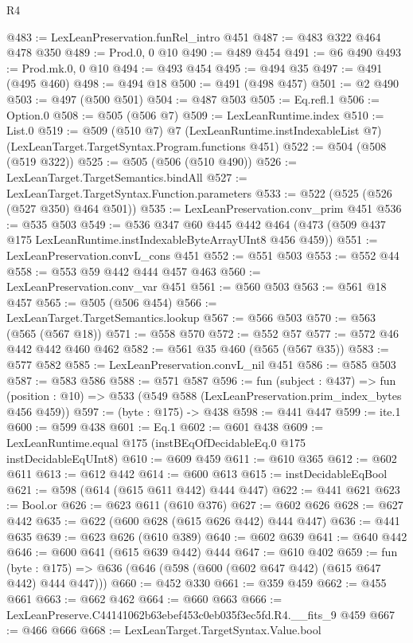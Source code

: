\begin{lexlean}{R4}
\begin{coremodule}
@483 := LexLeanPreservation.funRel_intro @451
@487 := @483 @322 @464 @478 @350
@489 := Prod.{0, 0} @10
@490 := @489 @454
@491 := @6 @490
@493 := Prod.mk.{0, 0} @10
@494 := @493 @454
@495 := @494 @35
@497 := @491 (@495 @460)
@498 := @494 @18
@500 := @491 (@498 @457)
@501 := @2 @490
@503 := @497 (@500 @501)
@504 := @487 @503
@505 := Eq.refl.{1}
@506 := Option.{0}
@508 := @505 (@506 @7)
@509 := LexLeanRuntime.index
@510 := List.{0}
@519 := @509
    (@510 @7)
    @7
    (LexLeanRuntime.instIndexableList @7)
    (LexLeanTarget.TargetSyntax.Program.functions @451)
@522 := @504 (@508 (@519 @322))
@525 := @505 (@506 (@510 @490))
@526 := LexLeanTarget.TargetSemantics.bindAll
@527 := LexLeanTarget.TargetSyntax.Function.parameters
@533 := @522 (@525 (@526 (@527 @350) @464 @501))
@535 := LexLeanPreservation.conv_prim @451
@536 := @535 @503
@549 := @536
    @347
    @60
    @445
    @442
    @464
    (@473 (@509 @437 @175 LexLeanRuntime.instIndexableByteArrayUInt8 @456 @459))
@551 := LexLeanPreservation.convL_cons @451
@552 := @551 @503
@553 := @552 @44
@558 := @553 @59 @442 @444 @457 @463
@560 := LexLeanPreservation.conv_var @451
@561 := @560 @503
@563 := @561 @18 @457
@565 := @505 (@506 @454)
@566 := LexLeanTarget.TargetSemantics.lookup
@567 := @566 @503
@570 := @563 (@565 (@567 @18))
@571 := @558 @570
@572 := @552 @57
@577 := @572 @46 @442 @442 @460 @462
@582 := @561 @35 @460 (@565 (@567 @35))
@583 := @577 @582
@585 := LexLeanPreservation.convL_nil @451
@586 := @585 @503
@587 := @583 @586
@588 := @571 @587
@596 := fun (subject : @437) =>
  fun (position : @10) => @533 (@549 @588 (LexLeanPreservation.prim_index_bytes @456 @459))
@597 := (byte : @175) -> @438
@598 := @441 @447
@599 := ite.{1}
@600 := @599 @438
@601 := Eq.{1}
@602 := @601 @438
@609 := LexLeanRuntime.equal @175 (instBEqOfDecidableEq.{0} @175 instDecidableEqUInt8)
@610 := @609 @459
@611 := @610 @365
@612 := @602 @611
@613 := @612 @442
@614 := @600 @613
@615 := instDecidableEqBool
@621 := @598 (@614 (@615 @611 @442) @444 @447)
@622 := @441 @621
@623 := Bool.or
@626 := @623 @611 (@610 @376)
@627 := @602 @626
@628 := @627 @442
@635 := @622 (@600 @628 (@615 @626 @442) @444 @447)
@636 := @441 @635
@639 := @623 @626 (@610 @389)
@640 := @602 @639
@641 := @640 @442
@646 := @600 @641 (@615 @639 @442) @444
@647 := @610 @402
@659 := fun (byte : @175) => @636 (@646 (@598 (@600 (@602 @647 @442) (@615 @647 @442) @444 @447)))
@660 := @452 @330
@661 := @359 @459
@662 := @455 @661
@663 := @662 @462
@664 := @660 @663
@666 := LexLeanPreserve.C44141062b63ebef453c0eb035f3ec5fd.R4.__fits_9 @459
@667 := @466 @666
@668 := LexLeanTarget.TargetSyntax.Value.bool

\end{coremodule}
\end{lexlean}
